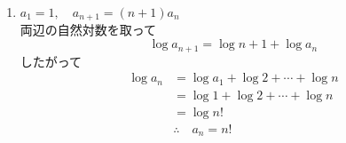 \begin{enumerate}[label=(\arabic*),parsep=3pt]
\begin{align*}
           & b_n+2=3\cdot2^{n-1}     \\
           & a_n=3^{3\cdot2^{n-1}-2}
        \end{align*}
  \item $\displaystyle a_1=1,\quad a_{n+1}=(n+1)a_n$\\
        両辺の自然対数を取って
        \[
          \log a_{n+1}=\log{n+1}+\log a_n
        \]
        したがって
        \begin{align*}
          \log a_n&=\log a_1 + \log{2}+\cdots+ \log{n}\\
                   &=\log 1 + \log{2}+\cdots +\log{n}\\
                   &=\log n!\\
                   &\therefore \quad a_n=n!
        \end{align*}
\end{enumerate}

